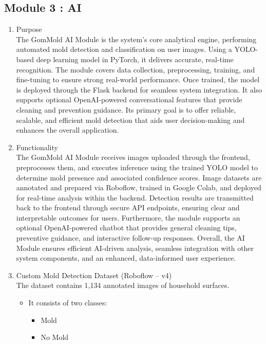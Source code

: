 \documentclass[conference]{IEEEtran}
\begin{document}
\subsection{Module 3 : AI}
\begin{enumerate}
\item[1)] Purpose\\
  The GomMold AI Module is the system’s core analytical engine, performing automated mold detection and classification on user images. Using a YOLO-based deep learning model in PyTorch, it delivers accurate, real-time recognition. The module covers data collection, preprocessing, training, and fine-tuning to ensure strong real-world performance. Once trained, the model is deployed through the Flask backend for seamless system integration. It also supports optional OpenAI-powered conversational features that provide cleaning and prevention guidance. Its primary goal is to offer reliable, scalable, and efficient mold detection that aids user decision-making and enhances the overall application.\\
\item[2)] Functionality\\
   The GomMold AI Module receives images uploaded through the frontend, preprocesses them, and executes inference using the trained YOLO model to determine mold presence and associated confidence scores. Image datasets are annotated and prepared via Roboflow, trained in Google Colab, and deployed for real-time analysis within the backend. Detection results are transmitted back to the frontend through secure API endpoints, ensuring clear and interpretable outcomes for users. Furthermore, the module supports an optional OpenAI-powered chatbot that provides general cleaning tips, preventive guidance, and interactive follow-up responses. Overall, the AI Module ensures efficient AI-driven analysis, seamless integration with other system components, and an enhanced, data-informed user experience.\\
   
\item[3)] Custom Mold Detection Dataset (Roboflow – v4)\\
\noindent The dataset contains 1,134 annotated images of household surfaces.
    \begin{itemize}
        \item It consists of two classes:
            \begin{itemize}
                \item Mold
                \item No Mold
            \end{itemize}
            

\end{itemize}
\end{enumerate}
\end{document}
